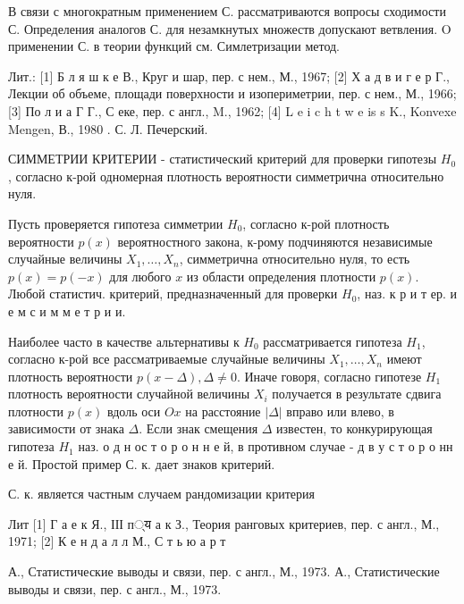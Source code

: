 \documentclass[10pt]{article}
\begin{document}
В связи с многократным применением С. рассматриваются вопросы сходимости С. Определения аналогов С. для незамкнутых множеств допускают ветвления. O применении С. в теории функций см. Симлетризации метод.



Лит.: [1] Б л я ш к е В., Круг и шар, пер. с нем., М., 1967; [2] Х а д в и г е р Г., Лекции об объеме, площади поверхности и изопериметрии, пер. с нем., М., 1966; [3] По л и а Г Г., С еке, пер. с англ., M., 1962; [4] L e i c h t w e is s K., Konvexe Mengen, В., 1980 . С. Л. Печерский.



СИММЕТРИИ КРИТЕРИИ - статистический критерий для проверки гипотезы $H_{0}$, согласно к-рой одномерная плотность вероятности симметрична относительно нуля.



Пусть проверяется гипотеза симметрии $H_{0}$, согласно к-рой плотность вероятности $p(x)$ вероятностного закона, к-рому подчиняются независимые случайные величины $X_{1}, \ldots, X_{n}$, симметрична относительно нуля, то есть $p(x)=p(-x)$ для любого $x$ из области определения плотности $p(x)$. Любой статистич. критерий, предназначенный для проверки $H_{0}$, наз. к р и т ер. и е м с и м м е т р и и.



Наиболее часто в качестве альтернативы к $H_{0}$ рассматривается гипотеза $H_{1}$, согласно к-рой все рассматриваемые случайные величины $X_{1}, \ldots, X_{n}$ имеют плотность вероятности $p(x-\Delta), \Delta \neq 0$. Иначе говоря, согласно гипотезе $H_{1}$ плотность вероятности случайной величины $X_{i}$ получается в результате сдвига плотности $p(x)$ вдоль оси $O x$ на расстояние $|\Delta|$ вправо или влево, в зависимости от знака $\Delta$. Если знак смещения $\Delta$ известен, то конкурирующая гипотеза $H_{1}$ наз. о д н ос т о р о н н е й, в противном случае - д в у с т о р о нн е й. Простой пример С. к. дает знаков критерий.



С. к. является частным случаем рандомизации критерия



Лит [1] Г а е к Я., ІІІ п्य а к З., Теория ранговых критериев, пер. с англ., М., 1971; [2] К е н д а л л М., С т ь ю а р т

А., Статистические выводы и связи, пер. с англ., М., 1973. А., Статистические выводы и связи, пер. с англ., М., 1973.
\end{document}
